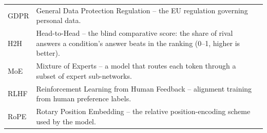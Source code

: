 \documentclass[a4paper,oneside,12pt]{book}
\numberwithin{equation}{chapter} %
\numberwithin{algorithm}{chapter} %
\begin{document}
\begin{tabular}{lp{15cm}l}
GDPR    & General Data Protection Regulation -- the EU regulation governing personal data. \\
H2H     & Head-to-Head -- the blind comparative score: the share of rival answers a condition's answer beats in the ranking (0--1, higher is better). \\
MoE     & Mixture of Experts -- a model that routes each token through a subset of expert sub-networks. \\
RLHF    & Reinforcement Learning from Human Feedback -- alignment training from human preference labels. \\
RoPE    & Rotary Position Embedding -- the relative position-encoding scheme used by the model. \\
\end{tabular}
\vspace{2cm}
\end{document}
